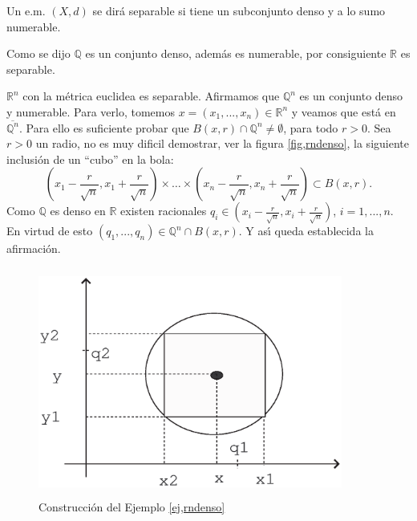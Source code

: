 \begin{definicion} Un e.m. $(X,d)$ se dir\'a separable si tiene un
subconjunto denso y a lo sumo numerable.
\end{definicion}

\begin{ejemplo} Como se dijo $\mathbb{Q}$ es un conjunto denso,
adem\'as es numerable, por consiguiente $\mathbb{R}$ es separable.
\end{ejemplo}

\begin{ejemplo}\label{ej,rndenso} $\mathbb{R}^n$ con la m\'etrica euclidea es
separable. Afirmamos que $\mathbb{Q}^n$ es un conjunto denso y
numerable. Para verlo, tomemos $x=(x_1,...,x_n)\in \mathbb{R}^n$ y
veamos que est\'a en $\overline{\mathbb{Q}^n}$. Para ello es
suficiente probar que $B(x,r)\cap \mathbb{Q}^n\neq\emptyset$, para
todo $r>0$. Sea $r>0$ un radio, no es muy dificil demostrar, ver
la figura \vref{fig,rndenso}, la siguiente inclusi\'on de un
``cubo'' en la bola:
\[
    (x_1-\frac{r}{\sqrt{n}},x_1+\frac{r}{\sqrt{n}})\times\dots\times
    (x_n-\frac{r}{\sqrt{n}},x_n+\frac{r}{\sqrt{n}})\subset B(x,r).
\]
Como $\mathbb{Q}$ es denso en $\mathbb{R}$ existen racionales
$q_i\in (x_i-\frac{r}{\sqrt{n}},x_i+\frac{r}{\sqrt{n}})$,
$i=1,...,n$. En virtud de esto $(q_1,...,q_n)\in\mathbb{Q}^n\cap
B(x,r)$. Y as\'{\i} queda establecida la afirmaci\'on.

\begin{figure}[h]
\begin{center}
    \includegraphics[height=7.5cm, width=10cm]{rndenso.eps}
    \caption{Construcci\'on del Ejemplo
    \ref{ej,rndenso}}\label{fig,rndenso}
\end{center}
\end{figure}
\end{ejemplo}

